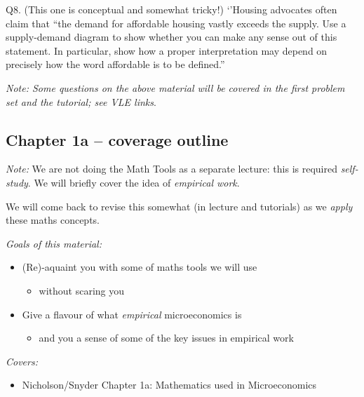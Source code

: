 \documentclass[]{article}
\providecommand{\tightlist}{%
  \setlength{\itemsep}{0pt}\setlength{\parskip}{0pt}}
\begin{document}
Q8. (This one is conceptual and somewhat tricky!) `'Housing advocates often claim that ``the demand for affordable housing vastly exceeds the supply. Use a supply-demand diagram to show whether you can make any sense out of this statement. In particular, show how a proper interpretation may depend on precisely how the word affordable is to be defined.''

\emph{Note: Some questions on the above material will be covered in the first problem set and the tutorial; see VLE links}.

\hypertarget{chapter-1a-coverage-outline}{%
\subsection{Chapter 1a -- coverage outline}\label{chapter-1a-coverage-outline}}

\emph{Note:} We are not doing the Math Tools as a separate lecture: this is required \emph{self-study}. We will briefly cover the idea of \emph{empirical work}.

We will come back to revise this somewhat (in lecture and tutorials) as we \emph{apply} these maths concepts.

\emph{Goals of this material:}

\begin{itemize}
\tightlist
\item
  (Re)-aquaint you with some of maths tools we will use

  \begin{itemize}
  \tightlist
  \item
    without scaring you
  \end{itemize}
\end{itemize}

\begin{itemize}
\tightlist
\item
  Give a flavour of what \emph{empirical} microeconomics is

  \begin{itemize}
  \tightlist
  \item
    and you a sense of some of the key issues in empirical work
  \end{itemize}
\end{itemize}

\bigskip

\emph{Covers:}

\begin{itemize}
\tightlist
\item
  Nicholson/Snyder Chapter 1a: Mathematics used in Microeconomics
\end{itemize}
\end{document}
